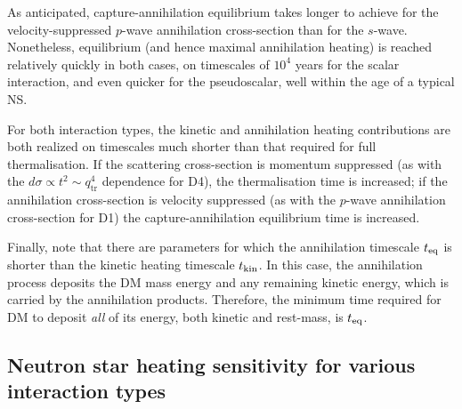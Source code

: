 As anticipated, capture-annihilation equilibrium takes longer to achieve for the velocity-suppressed $p$-wave annihilation cross-section than for the $s$-wave.  Nonetheless,  
equilibrium (and hence maximal annihilation heating) is reached relatively quickly in both cases, on timescales of $10^4$ years for the scalar interaction, and even quicker for the pseudoscalar, well within the age of a typical NS. 


For both interaction types, the kinetic and annihilation heating contributions are both realized on timescales much shorter than that required for full thermalisation. If the scattering cross-section is momentum suppressed (as with the $d\sigma \propto t^2 \sim q_\text{tr}^4$ dependence for D4), the thermalisation time is increased; if the annihilation cross-section is velocity suppressed (as with the $p$-wave annihilation cross-section for D1) the capture-annihilation equilibrium time is increased.


 
Finally, note that there are parameters for which the annihilation timescale $t_{\rm eq}$ is shorter than the kinetic heating timescale $t_{\rm kin}$. In this case, the annihilation process deposits the DM mass energy and any remaining kinetic energy, which is carried by the annihilation products. Therefore, the minimum time required for DM to deposit {\it all} of its energy, both kinetic and rest-mass, is $t_{\rm eq}$.


\subsection{Neutron star heating sensitivity for various interaction types}   
\label{ref:heatingresults}


